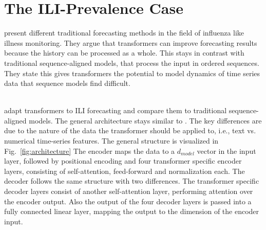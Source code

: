 \documentclass[11pt,a4paper]{article}
\begin{document}
\section{The ILI-Prevalence Case} %
\label{sec:ili-prevalence-case}
\citet{wu_2020} present different traditional forecasting methods in the field of influenza like illness monitoring.
They argue that transformers can improve forecasting results because the history can be processed as a whole.
This stays in contrast with traditional sequence-aligned models, that process the input in ordered sequences.
They state this gives transformers the potential to model
dynamics of time series data that sequence models find difficult.

~\\ %
\citet{wu_2020} adapt transformers to ILI forecasting and compare them to traditional sequence-aligned models. 
The general architecture stays similar to \citet{Vaswani2017}. 
The key differences are due to the nature of the data the transformer should be applied to, i.e., text vs. numerical time-series features.
The general structure is visualized in Fig.~\ref{fig:architecture}
The encoder maps the data to a $d_{model}$ vector in the input layer, followed by positional encoding and four transformer specific encoder layers, consisting of self-attention, feed-forward and normalization each.
The decoder follows the same structure with two differences.
The transformer specific decoder layers consist of another self-attention layer, performing attention over the encoder output.
Also the output of the four decoder layers is passed into a fully connected linear layer, mapping the output to the dimension of the encoder input.
\end{document}
